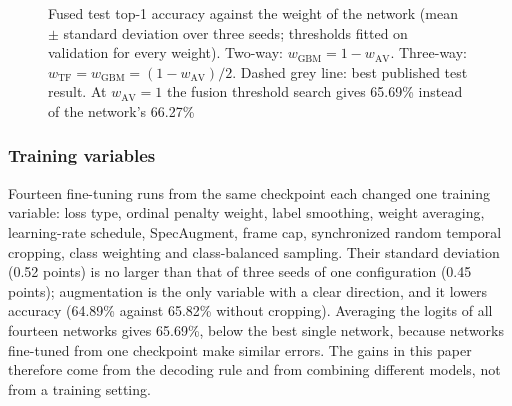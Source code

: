 \documentclass[pdflatex,iicol,sn-basic]{sn-jnl}
\begin{document}
\begin{figure}[t]
\centering
{}
\caption{Fused test top-1 accuracy against the weight of the network (mean $\pm$ standard deviation over three seeds; thresholds fitted on validation for every weight). Two-way: $w_{\mathrm{GBM}} = 1 - w_{\mathrm{AV}}$. Three-way: $w_{\mathrm{TF}} = w_{\mathrm{GBM}} = (1 - w_{\mathrm{AV}})/2$. Dashed grey line: best published test result. At $w_{\mathrm{AV}} = 1$ the fusion threshold search gives 65.69\% instead of the network's 66.27\%}
\label{fig:sensitivity}
\end{figure}

\subsubsection{Training variables}\label{sec:abl_other}

Fourteen fine-tuning runs from the same checkpoint each changed one training variable: loss type, ordinal penalty weight, label smoothing, weight averaging, learning-rate schedule, SpecAugment, frame cap, synchronized random temporal cropping, class weighting and class-balanced sampling. Their standard deviation (0.52 points) is no larger than that of three seeds of one configuration (0.45 points); augmentation is the only variable with a clear direction, and it lowers accuracy (64.89\% against 65.82\% without cropping). Averaging the logits of all fourteen networks gives 65.69\%, below the best single network, because networks fine-tuned from one checkpoint make similar errors. The gains in this paper therefore come from the decoding rule and from combining different models, not from a training setting.
\end{document}
